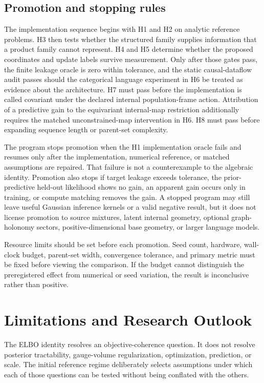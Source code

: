 \section{Promotion and stopping rules}

The implementation sequence begins with H1 and H2 on analytic reference problems. H3 then tests whether the structured family supplies information that a product family cannot represent. H4 and H5 determine whether the proposed coordinates and update labels survive measurement. Only after those gates pass, the finite leakage oracle is zero within tolerance, and the static causal-dataflow audit passes should the categorical language experiment in H6 be treated as evidence about the architecture. H7 must pass before the implementation is called covariant under the declared internal population-frame action. Attribution of a predictive gain to the equivariant internal-map restriction additionally requires the matched unconstrained-map intervention in H6. H8 must pass before expanding sequence length or parent-set complexity.

The program stops promotion when the H1 implementation oracle fails and resumes only after the implementation, numerical reference, or matched assumptions are repaired. That failure is not a counterexample to the algebraic identity. Promotion also stops if target leakage exceeds tolerance, the prior-predictive held-out likelihood shows no gain, an apparent gain occurs only in training, or compute matching removes the gain. A stopped program may still leave useful Gaussian inference kernels or a valid negative result, but it does not license promotion to source mixtures, latent internal geometry, optional graph-holonomy sectors, positive-dimensional base geometry, or larger language models.

Resource limits should be set before each promotion. Seed count, hardware, wall-clock budget, parent-set width, convergence tolerance, and primary metric must be fixed before viewing the comparison. If the budget cannot distinguish the preregistered effect from numerical or seed variation, the result is inconclusive rather than positive.

\chapter{Limitations and Research Outlook}

The ELBO identity resolves an objective-coherence question. It does not resolve posterior tractability, gauge-volume regularization, optimization, prediction, or scale. The initial reference regime deliberately selects assumptions under which each of those questions can be tested without being conflated with the others.

